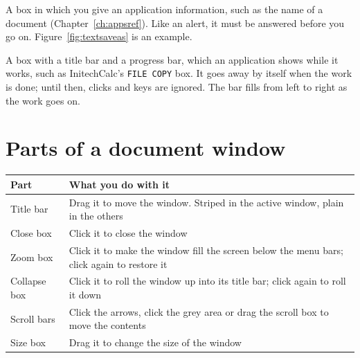 A box in which you give an application information,
such as the name of a document (Chapter~\ref{ch:appsref}).  Like an alert, it must be
answered before you go on.  Figure~\ref{fig:textsaveas} is an example.

A box with a title bar and a progress bar, which
an application shows while it works, such as InitechCalc's
\texttt{FILE COPY} box.  It goes away by itself when the work is done; until
then, clicks and keys are ignored.  The bar fills from left to right as the
work goes on.



\section{Parts of a document window}

\begin{center}\small
\begin{tabular}{@{}p{26mm}p{73mm}@{}}
\textbf{Part} & \textbf{What you do with it}\\\hline
Title bar & Drag it to move the window.  Striped in the active window,
plain in the others\\
Close box & Click it to close the window\\
Zoom box & Click it to make the window fill the screen below the menu
bars; click again to restore it\\
Collapse box & Click it to roll the window up into its title bar; click
again to roll it down\\
Scroll bars & Click the arrows, click the grey area or drag the scroll box
to move the contents\\
Size box & Drag it to change the size of the window\\
\end{tabular}
\end{center}

